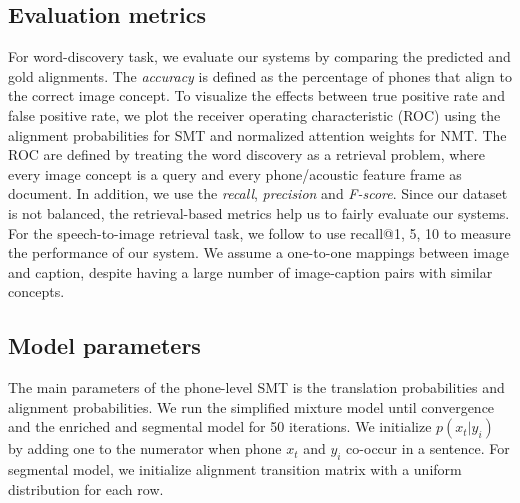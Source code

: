 \documentclass[journal]{IEEEtran}
\begin{document}
\subsection{Evaluation metrics}
For word-discovery task, we evaluate our systems by comparing the predicted and gold alignments. The \textit{accuracy} is defined as the percentage of phones that align to the correct image concept. To visualize the effects between true positive rate and false positive rate, we plot the receiver operating characteristic (ROC) using the alignment probabilities for SMT and normalized attention weights for NMT. The ROC are defined by treating the word discovery as a retrieval problem, where every image concept is a query and every phone/acoustic feature frame as document. In addition, we use the \textit{recall}, \textit{precision} and \textit{F-score}. Since our dataset is not balanced, the retrieval-based metrics help us to fairly evaluate our systems. For the speech-to-image retrieval task, we follow \cite{Harwath15, Karpathy15} to use recall@1, 5, 10 to measure the performance of our system. We assume a one-to-one mappings between image and caption, despite having a large number of image-caption pairs with similar concepts.      

\subsection{Model parameters}
The main parameters of the phone-level SMT is the translation probabilities and alignment probabilities. We run the simplified mixture model until convergence and the enriched and segmental model for 50 iterations. We initialize $p(x_t|y_i)$ by adding one to the numerator when phone $x_t$ and $y_i$ co-occur in a sentence. For segmental model, we initialize alignment transition matrix with a uniform distribution for each row. 
\end{document}

